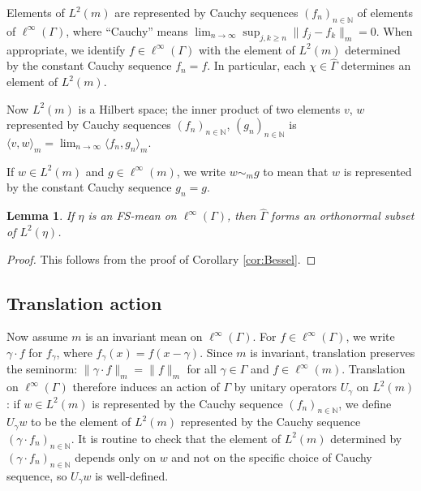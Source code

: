 \documentclass[12pt]{amsart} \usepackage{amsmath,centernot,amssymb,leftindex}
\newtheorem{lemma}[theorem]{Lemma}
\numberwithin{theorem}{section}
\numberwithin{equation}{section}
\theoremstyle{definition}
\begin{document}
Elements of $L^2(m)$ are represented by Cauchy sequences $(f_n)_{n\in \mathbb N}$ of elements of $\ell^\infty(\Gamma)$, where ``Cauchy'' means  $\lim_{n\to\infty} \sup_{j,k\geq n} \|f_j-f_k\|_m=0$.  When appropriate, we identify $f\in \ell^{\infty}(\Gamma)$ with the element of $L^{2}(m)$ determined by the constant Cauchy sequence $f_{n}=f$.  In particular, each $\chi\in\widehat{\Gamma}$ determines an element of $L^{2}(m)$.

Now $L^{2}(m)$ is a Hilbert space; the inner product of two elements $v$, $w$ represented by Cauchy sequences $(f_{n})_{n\in \mathbb N}$, $(g_{n})_{n\in \mathbb N}$ is $\langle v,w \rangle_{m}=\lim_{n\to\infty} \langle f_{n},g_{n}\rangle_{m}.$
	
If $w\in L^{2}(m)$ and $g\in \ell^{\infty}(m)$, we write $w\sim_{m} g$ to mean that $w$ is represented by the constant Cauchy sequence $g_{n}=g$.
	
\begin{lemma}\label{lem:FSisHartmanUD}  If $\eta$ is an FS-mean on $\ell^{\infty}(\Gamma)$, then  $\widehat{\Gamma}$ forms an orthonormal subset of $L^{2}(\eta)$.
\end{lemma}

\begin{proof}
This follows from the proof of Corollary \ref{cor:Bessel}.
\end{proof}
	
	\subsection{Translation action}  Now assume $m$ is an invariant mean on $\ell^{\infty}(\Gamma)$.  For $f\in \ell^\infty(\Gamma)$, we write $\gamma\cdot f$ for $f_\gamma$, where  $f_\gamma(x)=f(x-\gamma)$.  Since $m$ is invariant, translation preserves the seminorm: $\|\gamma \cdot f\|_{m}=\|f\|_{m}$ for all $\gamma\in \Gamma$ and $f\in \ell^{\infty}(m)$.   Translation on $\ell^{\infty}(\Gamma)$ therefore induces an action of $\Gamma$ by unitary operators $U_{\gamma}$ on $L^2(m)$: if $w\in L^2(m)$ is represented by the Cauchy sequence $(f_n)_{n\in\mathbb N}$, we define $U_\gamma w$ to be the element of $L^2(m)$ represented by the Cauchy sequence $(\gamma \cdot f_n)_{n\in \mathbb N}$.  It is routine to check that the element of $L^{2}(m)$ determined by $(\gamma \cdot f_n)_{n\in \mathbb N}$ depends only on $w$ and not on the specific choice of Cauchy sequence, so $U_{\gamma}w$ is well-defined.
	


	
	
\end{document}
